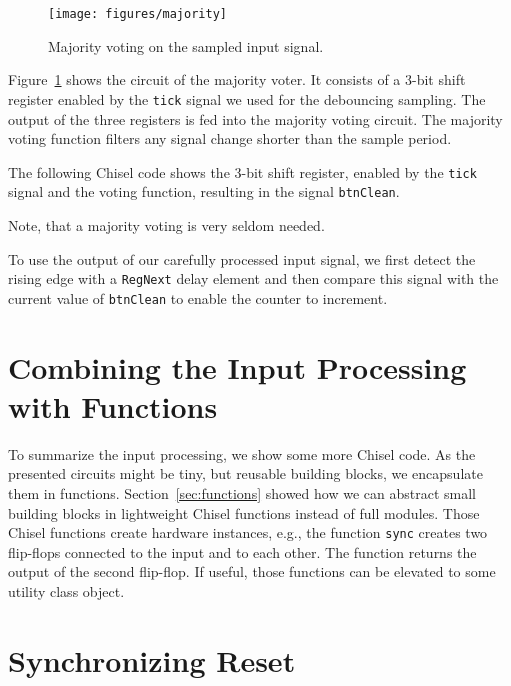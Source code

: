 \documentclass[%
    10pt,
    headinclude, footexclude,
    openright, %
    notitlepage,
    cleardoubleempty,
    headsepline,
    pointlessnumbers,
    bibtotoc, idxtotoc,
    ]{scrbook}
\newcommand{\code}[1]{{\small{\texttt{#1}}}}
\begin{document}
\begin{figure}
  \centering
  \texttt{[image: figures/majority]}
  \caption{Majority voting on the sampled input signal.}
  \label{fig:majority}
\end{figure}

Figure~\ref{fig:majority} shows the circuit of the majority voter.
It consists of a 3-bit shift register enabled by the \code{tick} signal
we used for the debouncing sampling. The output of the three registers
is fed into the majority voting circuit. The majority voting function filters
any signal change shorter than the sample period. 

The following Chisel code shows the 3-bit shift register, enabled by the
\code{tick} signal and the voting function, resulting in the signal \code{btnClean}.

Note, that a majority voting is very seldom needed.


To use the output of our carefully processed input signal, we first detect
the rising edge with a \code{RegNext} delay element and then compare this
signal with the current value of \code{btnClean} to enable the counter to increment.



\section{Combining the Input Processing with Functions}

To summarize the input processing, we show some more Chisel code.
As the presented circuits might be tiny, but reusable building blocks, we encapsulate
them in functions. Section~\ref{sec:functions} showed how we can abstract
small building blocks in lightweight Chisel functions instead of full modules.
Those Chisel functions create hardware instances, e.g., the function
\code{sync} creates two flip-flops connected to the input and to each other.
The function returns the output of the second flip-flop.
If useful, those functions can be elevated to some utility class object.


\section{Synchronizing Reset}
\end{document}
